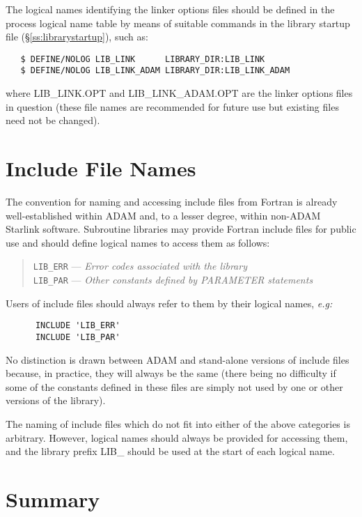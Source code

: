 The logical names identifying the linker options files should be defined in
the process logical name table by means of suitable commands in the library
startup file (\S\ref{ss:librarystartup}), such as:

\begin{verbatim}
   $ DEFINE/NOLOG LIB_LINK      LIBRARY_DIR:LIB_LINK
   $ DEFINE/NOLOG LIB_LINK_ADAM LIBRARY_DIR:LIB_LINK_ADAM
\end{verbatim}

where LIB\_LINK.OPT and LIB\_LINK\_ADAM.OPT are the linker options files in
question (these file names are recommended for future use but existing files
need not be changed).


\section{Include File Names}

The convention for naming and accessing include files from Fortran is
already well-established within ADAM and, to a lesser degree, within
non-ADAM Starlink software.
Subroutine libraries may provide Fortran include files for public use and
should define logical names to access them as follows:

\begin{quote}
{\tt LIB\_ERR} --- {\em Error codes associated with the library} \\
{\tt LIB\_PAR} --- {\em Other constants defined by PARAMETER statements}
\end{quote}

Users of include files should always refer to them by their logical names,
{\em e.g:}

\begin{verbatim}
      INCLUDE 'LIB_ERR'
      INCLUDE 'LIB_PAR'
\end{verbatim}

No distinction is drawn between ADAM and stand-alone versions of include
files because, in practice, they will always be the same (there being no
difficulty if some of the constants defined in these files are simply not
used by one or other versions of the library).

The naming of include files which do not fit into either of the above
categories is arbitrary.
However, logical names should always be provided for accessing them, and the
library prefix LIB\_ should be used at the start of each logical name.

\newpage
\appendix
\section{Summary}

